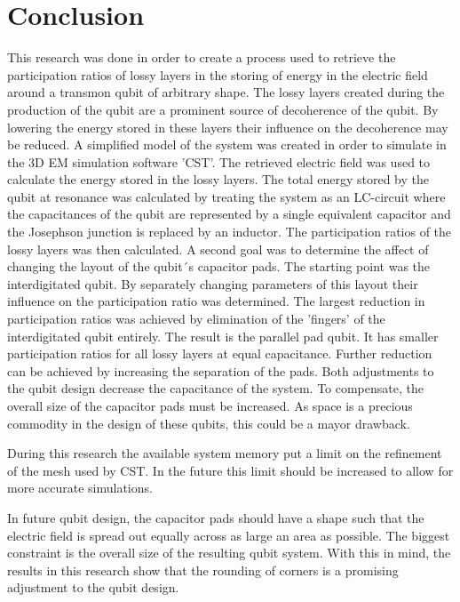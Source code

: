 \chapter{Conclusion}
This research was done in order to create a process used to retrieve the participation ratios of lossy layers in the storing of energy in the electric field around a transmon qubit of arbitrary shape. The lossy layers created during the production of the qubit are a prominent source of decoherence of the qubit. By lowering the energy stored in these layers their influence on the decoherence may be reduced. A simplified model of the system was created in order to simulate in the 3D EM simulation software 'CST'. The retrieved electric field was used to calculate the energy stored in the lossy layers. The total energy stored by the qubit at resonance was calculated by treating the system as an LC-circuit where the capacitances of the qubit are represented by a single equivalent capacitor and the Josephson junction is replaced by an inductor. The participation ratios of the lossy layers was then calculated. 
A second goal was to determine the affect of changing the layout of the qubit´s capacitor pads. The starting point was the interdigitated qubit. By separately changing parameters of this layout their influence on the participation ratio was determined. 
The largest reduction in participation ratios was achieved by elimination of the 'fingers' of the interdigitated qubit entirely. The result is the parallel pad qubit. It has smaller participation ratios for all lossy layers at equal capacitance.  Further reduction can be achieved by increasing the separation of the pads. Both adjustments to the qubit design decrease the capacitance of the system. To compensate, the overall size of the capacitor pads must be increased. As space is a precious commodity in the design of these qubits, this could be a mayor drawback.

During this research the available system memory put a limit on the refinement of the mesh used by CST. In the future this limit should be increased to allow for more accurate simulations.

In future qubit design, the capacitor pads should have a shape such that the electric field is spread out equally across as large an area as possible. The biggest constraint is the overall size of the resulting qubit system. With this in mind, the results in this research show that the rounding of corners is a promising adjustment to the qubit design. 